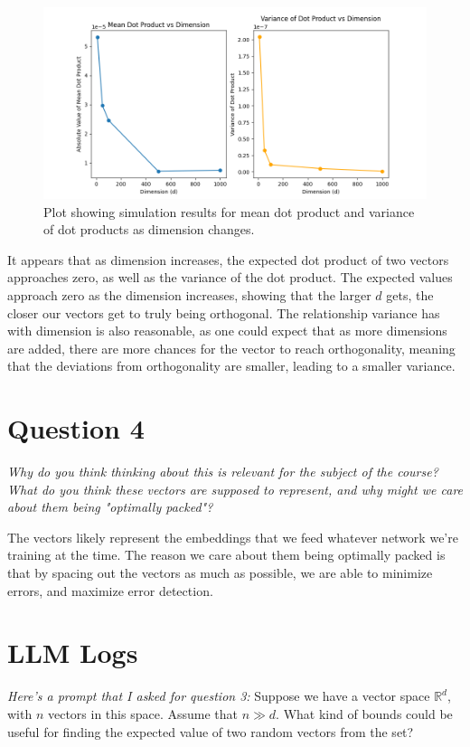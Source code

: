 \documentclass[hidelinks]{article}
\begin{document}
	\begin{figure}[h]
		\centering
		\includegraphics[width=6in]{simfig.png}
		\caption{Plot showing simulation results for mean dot product and variance of dot products as dimension changes.}
	\end{figure}
	
	It appears that as dimension increases, the expected dot product of two vectors approaches zero, as well as the variance of the dot product. The expected values approach zero as the dimension increases, showing that the larger $d$ gets, the closer our vectors get to truly being orthogonal. The relationship variance has with dimension is also reasonable, as one could expect that as more dimensions are added, there are more chances for the vector to reach orthogonality, meaning that the deviations from orthogonality are smaller, leading to a smaller variance.
	
	\section{Question 4}
	\textit{Why do you think thinking about this is relevant for the subject of the course? What do you think these vectors are supposed to represent, and why might we care about them being "optimally packed"?}
	
	The vectors likely represent the embeddings that we feed whatever network we're training at the time. The reason we care about them being optimally packed is that by spacing out the vectors as much as possible, we are able to minimize errors, and maximize error detection.
	\newpage
	
	\section{LLM Logs}
	
	\textit{Here's a prompt that I asked for question 3: } Suppose we have a vector space $\mathbb{R}^d$, with $n$ vectors in this space. Assume that $n \gg d$. What kind of bounds could be useful for finding the expected value of two random vectors from the set?
	
\end{document}
